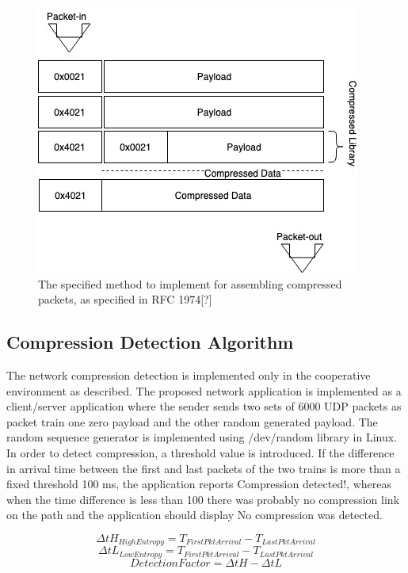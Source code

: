 \documentclass[sigconf]{acmart}
\begin{document}
\begin{figure}[h]
  \centering
  \includegraphics[width=\linewidth]{compression}
  \caption{The specified method to implement for assembling compressed packets, as specified in RFC 1974[?] }
\end{figure}


\subsection{Compression Detection Algorithm}
The network compression detection is implemented only in the cooperative environment as described. The proposed network application is implemented as a client/server application where the sender sends two sets of 6000 UDP packets as packet train one zero payload and the other random generated payload. The random sequence generator is implemented using /dev/random library in Linux. In order to detect compression, a threshold value is introduced. If the difference in arrival time between the first and last packets of the two trains is more than a fixed threshold 100 ms, the application reports Compression detected!, whereas when the time difference is less than 100 there was probably no compression link on the path and the application should display No compression was detected. 


\begin{displaymath}
	\Delta tH_{HighEntropy}  = T_{FirstPktArrival} - T_{LastPktArrival} 
\end{displaymath}
\begin{displaymath}
	\Delta tL_{LowEntropy}  = T_{FirstPktArrival} - T_{LastPktArrival} 
\end{displaymath}
\begin{equation}
 	DetectionFactor = \Delta tH - \Delta tL
\end{equation}
\label{delta}
\end{document}
